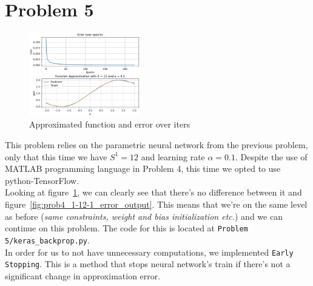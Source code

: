 \section{Problem 5}


\begin{figure}
	\centering
	\includegraphics[width=0.43\textwidth]{../Problem 5/nn_1_12_1_nodp.pdf}
	\caption{Approximated function and error over iters}
	\label{fig:prob5_1_12_1_nodp}
\end{figure}

This problem relies on the parametric neural network from the previous problem, only that this time we have $S^1=12$ and learning rate $\alpha=0.1$. Despite the use of MATLAB programming language in Problem 4, this time we opted to use python-TensorFlow.\\

Looking at figure~\ref{fig:prob5_1_12_1_nodp}, we can clearly see that there's no difference between it and figure~\ref{fig:prob4_1-12-1_error_output}. This means that we're on the same level as before (\textit{same constraints, weight and bias initialization etc.}) and we can continue on this problem.
The code for this is located at \verb|Problem 5/keras_backprop.py|.\\

In order for us to not have unnecessary computations, we implemented \verb|Early Stopping|. This is a method that stops neural network's train if there's not a significant change in approximation error.